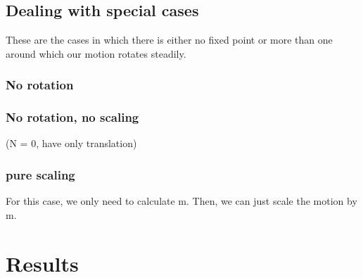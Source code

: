 \documentclass[journal, letterpaper]{IEEEtran}
\begin{document}
\subsection{Dealing with special cases}
These are the cases in which there is either no fixed point or more than one around which our motion rotates steadily.

\subsubsection{No rotation}

\subsubsection{No rotation, no scaling}
(N = 0, have only translation)

\subsubsection{pure scaling}
For this case, we only need to calculate m.  Then, we can just scale the motion by m.

\section{Results}
\end{document}
